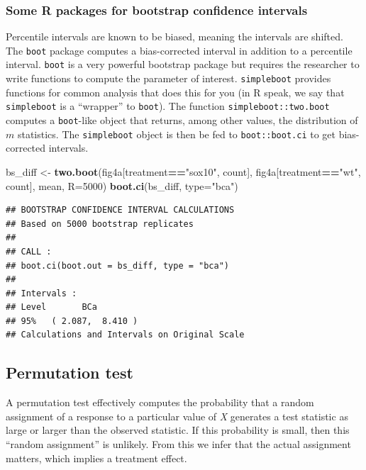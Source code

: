\documentclass[]{book}
\newenvironment{Shaded}{\begin{snugshade}}{\end{snugshade}}
\newcommand{\DataTypeTok}[1]{\textcolor[rgb]{0.13,0.29,0.53}{#1}}
\newcommand{\DecValTok}[1]{\textcolor[rgb]{0.00,0.00,0.81}{#1}}
\newcommand{\KeywordTok}[1]{\textcolor[rgb]{0.13,0.29,0.53}{\textbf{#1}}}
\newcommand{\NormalTok}[1]{#1}
\newcommand{\OperatorTok}[1]{\textcolor[rgb]{0.81,0.36,0.00}{\textbf{#1}}}
\newcommand{\StringTok}[1]{\textcolor[rgb]{0.31,0.60,0.02}{#1}}
\begin{document}
\hypertarget{some-r-packages-for-bootstrap-confidence-intervals}{%
\subsubsection{Some R packages for bootstrap confidence intervals}\label{some-r-packages-for-bootstrap-confidence-intervals}}

Percentile intervals are known to be biased, meaning the intervals are shifted. The \texttt{boot} package computes a bias-corrected interval in addition to a percentile interval. \texttt{boot} is a very powerful bootstrap package but requires the researcher to write functions to compute the parameter of interest. \texttt{simpleboot} provides functions for common analysis that does this for you (in R speak, we say that \texttt{simpleboot} is a ``wrapper'' to \texttt{boot}). The function \texttt{simpleboot::two.boot} computes a \texttt{boot}-like object that returns, among other values, the distribution of \(m\) statistics. The \texttt{simpleboot} object is then be fed to \texttt{boot::boot.ci} to get bias-corrected intervals.

\begin{Shaded}
\begin{Highlighting}[]
\NormalTok{bs_diff <-}\StringTok{ }\KeywordTok{two.boot}\NormalTok{(fig4a[treatment}\OperatorTok{==}\StringTok{"sox10"}\NormalTok{, count],}
\NormalTok{                    fig4a[treatment}\OperatorTok{==}\StringTok{"wt"}\NormalTok{, count],}
\NormalTok{                    mean, }
                    \DataTypeTok{R=}\DecValTok{5000}\NormalTok{)}
\KeywordTok{boot.ci}\NormalTok{(bs_diff, }\DataTypeTok{type=}\StringTok{"bca"}\NormalTok{)}
\end{Highlighting}
\end{Shaded}

\begin{verbatim}
## BOOTSTRAP CONFIDENCE INTERVAL CALCULATIONS
## Based on 5000 bootstrap replicates
## 
## CALL : 
## boot.ci(boot.out = bs_diff, type = "bca")
## 
## Intervals : 
## Level       BCa          
## 95%   ( 2.087,  8.410 )  
## Calculations and Intervals on Original Scale
\end{verbatim}

\hypertarget{permutation-test}{%
\subsection{Permutation test}\label{permutation-test}}

A permutation test effectively computes the probability that a random assignment of a response to a particular value of \emph{X} generates a test statistic as large or larger than the observed statistic. If this probability is small, then this ``random assignment'' is unlikely. From this we infer that the actual assignment matters, which implies a treatment effect.
\end{document}
